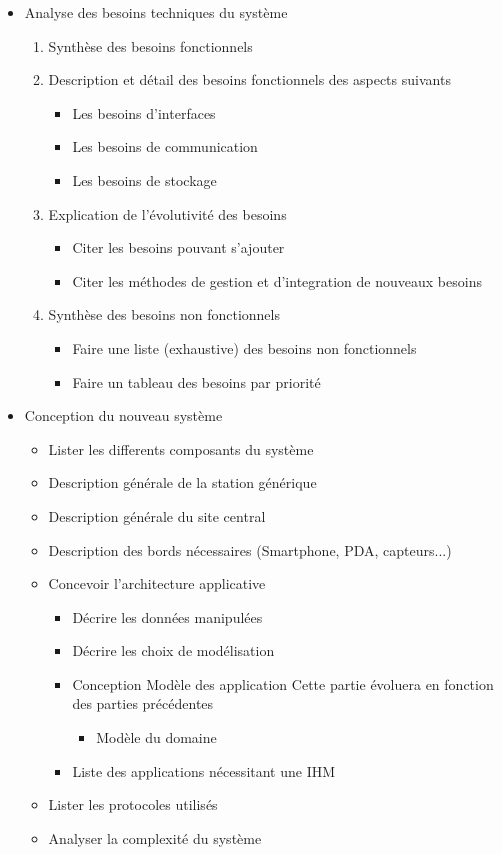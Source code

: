 \begin{itemize}
		
		\item Analyse des besoins techniques du système			 
		\begin{enumerate}
			\item Synthèse des besoins fonctionnels 	       
			\item Description et détail des besoins fonctionnels des aspects suivants
			\begin{itemize}
				\item Les besoins d'interfaces
				\item Les besoins de communication
				\item Les besoins de stockage
			\end{itemize}
			\item Explication de l'évolutivité des besoins
			\begin{itemize}
				\item Citer les besoins pouvant s'ajouter
				\item Citer les méthodes de gestion et d'integration de nouveaux besoins
			\end{itemize}	        
			\item Synthèse des besoins non fonctionnels
			\begin{itemize}
				\item Faire une liste (exhaustive) des besoins non fonctionnels
				\item Faire un tableau des besoins par priorité
			\end{itemize}
		\end{enumerate}	  
		  	
		\item Conception du nouveau système
		
			\begin{itemize}
				\item Lister les differents composants du système
				\item Description générale de la station générique
				\item Description générale du site central
				\item Description des bords nécessaires (Smartphone, PDA, capteurs...)
				\item Concevoir l'architecture applicative 
				\begin{itemize}  
					\item Décrire les données manipulées
					\item Décrire les choix de modélisation      
					\item Conception Modèle des application
					Cette partie évoluera en fonction des parties précédentes
					\begin{itemize}
					\item Modèle du domaine					
					\end{itemize}
					\item Liste des applications nécessitant une IHM          
				\end{itemize}          
				\item Lister les protocoles utilisés
				\item Analyser la complexité du système
			\end{itemize}       
				   

\end{itemize}
